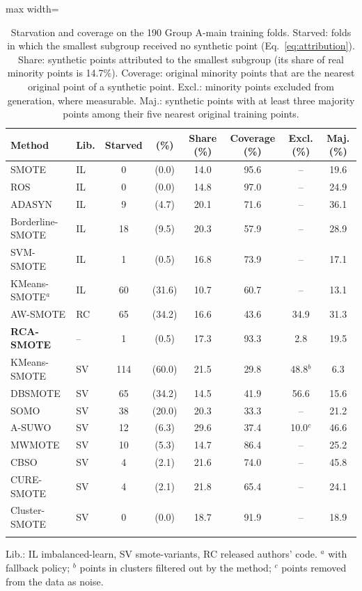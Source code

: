 \begin{table}[!htb]
\caption{Starvation and coverage on the 190 Group A-main training folds. Starved: folds in which the smallest subgroup received no synthetic point (Eq.~\ref{eq:attribution}). Share: synthetic points attributed to the smallest subgroup (its share of real minority points is 14.7\%). Coverage: original minority points that are the nearest original point of a synthetic point. Excl.: minority points excluded from generation, where measurable. Maj.: synthetic points with at least three majority points among their five nearest original training points.}\label{tab:starvation}
\centering\tabfont
\setlength{\tabcolsep}{3pt}
\begin{adjustbox}{max width=\textwidth}
\begin{tabular}{@{}llcccccc@{}}
\toprule
Method & Lib. & Starved & (\%) & Share (\%) & Coverage (\%) & Excl. (\%) & Maj. (\%) \\
\midrule
SMOTE & IL & 0 & (0.0) & 14.0 & 95.6 & -- & 19.6 \\
ROS & IL & 0 & (0.0) & 14.8 & 97.0 & -- & 24.9 \\
ADASYN & IL & 9 & (4.7) & 20.1 & 71.6 & -- & 36.1 \\
Borderline-SMOTE & IL & 18 & (9.5) & 20.3 & 57.9 & -- & 28.9 \\
SVM-SMOTE & IL & 1 & (0.5) & 16.8 & 73.9 & -- & 17.1 \\
KMeans-SMOTE$^{a}$ & IL & 60 & (31.6) & 10.7 & 60.7 & -- & 13.1 \\
AW-SMOTE & RC & 65 & (34.2) & 16.6 & 43.6 & 34.9 & 31.3 \\
\textbf{RCA-SMOTE} & -- & 1 & (0.5) & 17.3 & 93.3 & 2.8 & 19.5 \\
\midrule
KMeans-SMOTE & SV & 114 & (60.0) & 21.5 & 29.8 & 48.8$^{b}$ & 6.3 \\
DBSMOTE & SV & 65 & (34.2) & 14.5 & 41.9 & 56.6 & 15.6 \\
SOMO & SV & 38 & (20.0) & 20.3 & 33.3 & -- & 21.2 \\
A-SUWO & SV & 12 & (6.3) & 29.6 & 37.4 & 10.0$^{c}$ & 46.6 \\
MWMOTE & SV & 10 & (5.3) & 14.7 & 86.4 & -- & 25.2 \\
CBSO & SV & 4 & (2.1) & 21.6 & 74.0 & -- & 45.8 \\
CURE-SMOTE & SV & 4 & (2.1) & 21.8 & 65.4 & -- & 24.1 \\
Cluster-SMOTE & SV & 0 & (0.0) & 18.7 & 91.9 & -- & 18.9 \\
\botrule
\end{tabular}
\end{adjustbox}
\par\smallskip\raggedright\footnotesize Lib.: IL imbalanced-learn, SV smote-variants, RC released authors' code. $^{a}$ with fallback policy; $^{b}$ points in clusters filtered out by the method; $^{c}$ points removed from the data as noise.
\end{table}

